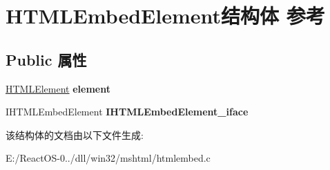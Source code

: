 \hypertarget{struct_h_t_m_l_embed_element}{}\section{H\+T\+M\+L\+Embed\+Element结构体 参考}
\label{struct_h_t_m_l_embed_element}
\subsection*{Public 属性}
\begin{DoxyCompactItemize}
\item 
\mbox{\label{struct_h_t_m_l_embed_element_a3bbc16b067705947cb1d14a6314f2f20}} 
\hyperlink{struct_h_t_m_l_element}{H\+T\+M\+L\+Element} {\bfseries element}
\item 
\mbox{\label{struct_h_t_m_l_embed_element_a1370b89c47588b65351d47cb0926e8ab}} 
I\+H\+T\+M\+L\+Embed\+Element {\bfseries I\+H\+T\+M\+L\+Embed\+Element\+\_\+iface}
\end{DoxyCompactItemize}


该结构体的文档由以下文件生成\+:\begin{DoxyCompactItemize}
\item 
E\+:/\+React\+O\+S-\/0../dll/win32/mshtml/htmlembed.\+c\end{DoxyCompactItemize}
